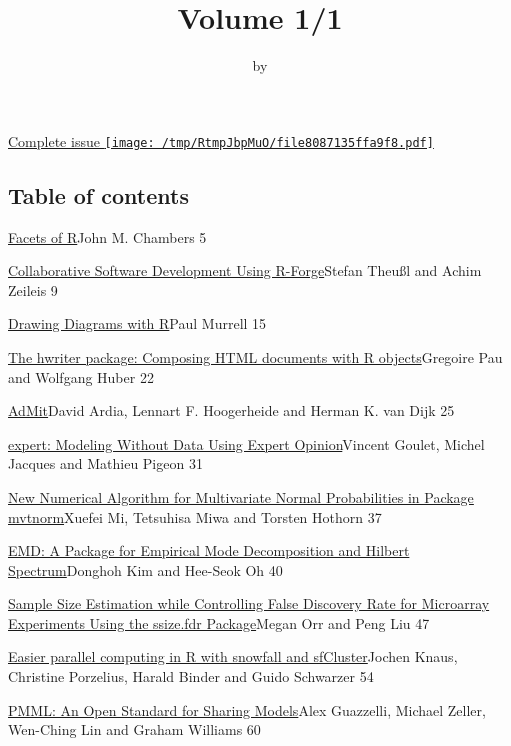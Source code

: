 \title{Volume 1/1}
\author{by }

\maketitle


\href{RJ-2009-1.pdf}{Complete issue
\protect\texttt{[image: /tmp/RtmpJbpMuO/file8087135ffa9f8.pdf]}}

\hypertarget{table-of-contents}{%
\subsection{Table of contents}\label{table-of-contents}}

\href{../../articles/RJ-2009-008}{Facets of R}John M. Chambers 5

\href{../../articles/RJ-2009-007}{Collaborative Software Development
Using R-Forge}Stefan Theußl and Achim Zeileis 9

\href{../../articles/RJ-2009-006}{Drawing Diagrams with R}Paul Murrell
15

\href{../../articles/RJ-2009-009}{The hwriter package: Composing HTML
documents with R objects}Gregoire Pau and Wolfgang Huber 22

\href{../../articles/RJ-2009-003}{AdMit}David Ardia, Lennart F.
Hoogerheide and Herman K. van Dijk 25

\href{../../articles/RJ-2009-005}{expert: Modeling Without Data Using
Expert Opinion}Vincent Goulet, Michel Jacques and Mathieu Pigeon 31

\href{../../articles/RJ-2009-001}{New Numerical Algorithm for
Multivariate Normal Probabilities in Package mvtnorm}Xuefei Mi,
Tetsuhisa Miwa and Torsten Hothorn 37

\href{../../articles/RJ-2009-002}{EMD: A Package for Empirical Mode
Decomposition and Hilbert Spectrum}Donghoh Kim and Hee-Seok Oh 40

\href{../../articles/RJ-2009-019}{Sample Size Estimation while
Controlling False Discovery Rate for Microarray Experiments Using the
ssize.fdr Package}Megan Orr and Peng Liu 47

\href{../../articles/RJ-2009-004}{Easier parallel computing in R with
snowfall and sfCluster}Jochen Knaus, Christine Porzelius, Harald Binder
and Guido Schwarzer 54

\href{../../articles/RJ-2009-010}{PMML: An Open Standard for Sharing
Models}Alex Guazzelli, Michael Zeller, Wen-Ching Lin and Graham Williams
60

